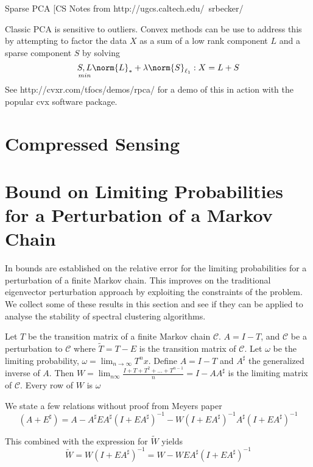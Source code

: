 Sparse PCA
[CS Notes from http://ugcs.caltech.edu/~srbecker/

Classic PCA is sensitive to outliers.  Convex methods can be use to address this by attempting to factor the data $X$ as a sum of a low rank component $L$ and a sparse component $S$ by solving
\begin{equation*}
\underset{min}{S,L} \norm{L}_* + \lambda \norm{S}_{\ell_1}  : X=L+S
\end{equation*}
See http://cvxr.com/tfocs/demos/rpca/ for a demo of this in action with the popular cvx software package.



\section*{Compressed Sensing}


\section*{Bound on Limiting Probabilities for a Perturbation of a Markov Chain}
In \cite{meyer1980condition} bounds are established on the relative error for the limiting probabilities for a perturbation of a finite Markov chain.  This improves on the traditional eigenvector perturbation approach by exploiting the constraints of the problem.  We collect some of these results in this section and see if they can be applied to analyse the stability of spectral clustering algorithms.

Let $T$ be the transition matrix of a finite Markov chain $\mathcal{C}$. $A=I-T$, and $\mathcal{C}$ be a perturbation to $\mathcal{C}$ where $\tilde{T} =T-E$ is the transition matrix of  $\mathcal{C}$. Let $\omega$ be the limiting probability, $\omega = \lim_{n \to \infty} T^n x$. Define $A=I-T$ and $A^\sharp$ the generalized inverse of $A$. Then $W=\lim_{n  \infty} \frac{I+T+T^2 + \ldots + T^{n-1}}{n} = I-A A^\sharp$ is the limiting matrix of $\mathcal{C}$.  Every row of $W$ is $\omega$

We state a few relations without proof from Meyers paper
\begin{equation*}
(A+E^\sharp)=A - A^\sharp E A^\sharp (I+ E A^\sharp)^{-1} - W(I+E A^\sharp)^{-1} A^\sharp (I+E A^\sharp)^{-1}
\end{equation*}

This combined with the expression for $\tilde{W}$ yields
\begin{equation*}
\tilde{W} = W(I+E A^\sharp)^{-1} = W - W E A^\sharp (I + E A^\sharp)^{-1}
\end{equation*}

